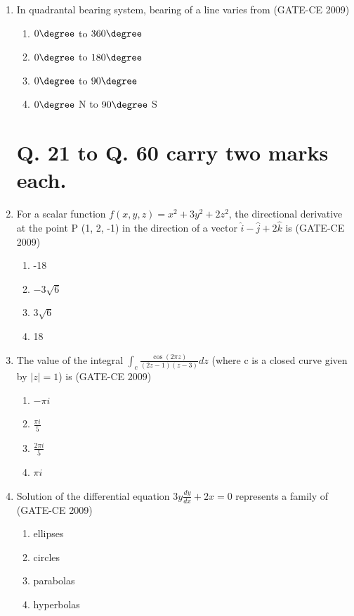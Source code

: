 \documentclass[journal,12pt,onecolumn]{article}
\theoremstyle{remark}
\begin{document}
\begin{enumerate}
    \item In quadrantal bearing system, bearing of a line varies from (GATE-CE 2009)
    \begin{multicols}{2}
    \begin{enumerate}
        \item $0\degree$ to $360\degree$ 
        \item $0\degree$ to $180\degree$
        \item $0\degree$ to $90\degree$ 
        \item $0\degree$ N to $90\degree$ S
    \end{enumerate}
    \end{multicols}

\section*{Q. 21 to Q. 60 carry two marks each.}

    \item For a scalar function $f(x, y, z) = x^2 + 3y^2 + 2z^2$, the directional derivative at the point P (1, 2, -1) in the direction of a vector $\hat{i} - \hat{j} + 2\hat{k}$ is (GATE-CE 2009)
    \begin{multicols}{4}
    \begin{enumerate}
        \item -18 
        \item $-3\sqrt{6}$ 
        \item $3\sqrt{6}$ 
        \item 18
    \end{enumerate}
    \end{multicols}

    \item The value of the integral $\int_{c} \frac{\cos(2\pi z)}{(2z-1)(z-3)} dz$ (where c is a closed curve given by $|z|=1$) is (GATE-CE 2009)
    \begin{multicols}{2}
    \begin{enumerate}
        \item $-\pi i$ 
        \item $\frac{\pi i}{5}$ 
        \item $\frac{2\pi i}{5}$ 
        \item $\pi i$
    \end{enumerate}
    \end{multicols}
    
    \item Solution of the differential equation $3y\frac{dy}{dx}+2x=0$ represents a family of (GATE-CE 2009)
    \begin{multicols}{2}
    \begin{enumerate}
        \item ellipses 
        \item circles 
        \item parabolas 
        \item hyperbolas
    \end{enumerate}
    \end{multicols}
    

\end{enumerate}
\end{document}
